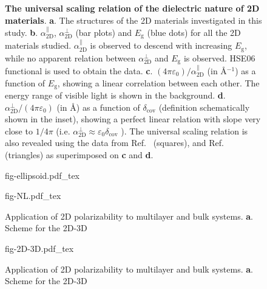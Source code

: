 \begin{figure}[H]
\centering
\caption{\label{fig-3} \textbf{The universal scaling relation of the
    dielectric nature of 2D materials}. \textbf{a}. The structures of
  the 2D materials investigated in this
  study. \textbf{b}. $\alpha_{\mathrm{2D}}^{\parallel}$,
  $\alpha_{\mathrm{2D}}^{\perp}$ (bar plots) and $E_{\mathrm{g}}$
  (blue dots) for all the 2D materials studied.
  $\alpha_{\mathrm{2D}}^{\parallel}$ is observed to descend with
  increasing $E_{\mathrm{g}}$, while no apparent relation between
  $\alpha_{\mathrm{2D}}^{\perp}$ and $E_{\mathrm{g}}$ is
  observed. HSE06 functional is used to obtain the data. \textbf{c}.
  $(4\pi \varepsilon_{0})/\alpha_{\mathrm{2D}}^{\parallel}$ (in
  \AA{}$^{-1}$) as a function of $E_{\mathrm{g}}$, showing a linear
  correlation between each other. The energy range of visible light is
  shown in the background. \textbf{d}.
  $\alpha_{\mathrm{2D}}^{\perp}/(4\pi\varepsilon_{0})$ (in \AA{}) as a
  function of $\delta_{\mathrm{cov}}$ (definition schematically shown
  in the inset), showing a perfect linear relation with slope very
  close to $1/4\pi$ (i.e.
  $\alpha_{\mathrm{2D}}^{\perp} \approx \varepsilon_{0}
  \delta_{\mathrm{cov}}$ ). The universal scaling relation is also
  revealed using the data from Ref.~\cite{Haastrup_2018} (squares),
  and Ref.~\cite{Mounet_2018} (triangles) as superimposed on
  \textbf{c} and \textbf{d}.}
\end{figure}




\begin{figure}[!htbp]
  \centering
  {fig-ellipsoid.pdf_tex}
  \caption{%
  }
  \label{fig:diel-ellipsoid}
\end{figure}

\begin{figure}[!htbp]
\centering
{fig-NL.pdf_tex}
  \caption{\label{fig:diel-NL}  %
    Application of 2D polarizability to
    multilayer and bulk systems.
    \textbf{a}. Scheme for the 2D-3D}

\end{figure}

\begin{figure}[!htbp]
\centering
{fig-2D-3D.pdf_tex}
  \caption{\label{fig:diel-2D-3D}  %
    Application of 2D polarizability to
    multilayer and bulk systems.
    \textbf{a}. Scheme for the 2D-3D}
\end{figure}



